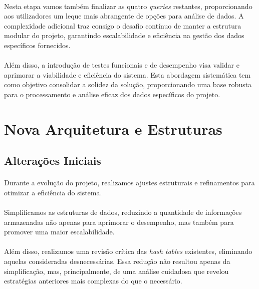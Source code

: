 \documentclass{article}
\begin{document}
\paragraph{}Nesta etapa vamos também finalizar as quatro \textit{queries} restantes, proporcionando aos utilizadores um leque mais abrangente de opções para análise de dados. A complexidade adicional traz consigo o desafio contínuo de manter a estrutura modular do projeto, garantindo escalabilidade e eficiência na gestão dos dados específicos fornecidos.
\vspace{-0.3cm}
\paragraph{}Além disso, a introdução de testes funcionais e de desempenho visa validar e aprimorar a viabilidade e eficiência do sistema. Esta abordagem sistemática tem como objetivo consolidar a solidez da solução, proporcionando uma base robusta para o processamento e análise eficaz dos dados específicos do projeto.
\section{Nova Arquitetura e Estruturas}
\subsection{Alterações Iniciais}
\paragraph{}Durante a evolução do projeto, realizamos ajustes estruturais e refinamentos para otimizar a eficiência do sistema. 
\vspace{-0.3cm}
\paragraph{}Simplificamos as estruturas de dados, reduzindo a quantidade de informações armazenadas não apenas para aprimorar o desempenho, mas também para promover uma maior 
escalabilidade. 
\vspace{-0.3cm}
\paragraph{}Além disso, realizamos uma revisão crítica das \textit{hash tables} existentes, eliminando aquelas consideradas desnecessárias. Essa redução não resultou apenas da simplificação, mas, principalmente, de uma análise cuidadosa que revelou estratégias anteriores mais complexas do que o necessário.
\vspace{-0.3cm}
\end{document}
